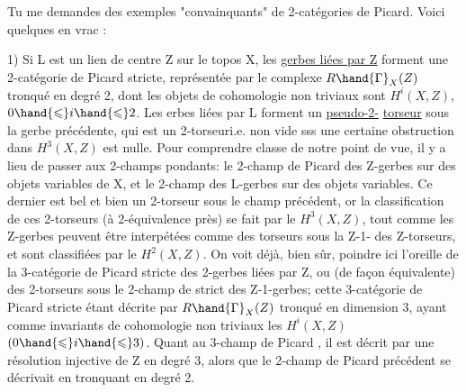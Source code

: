 
Tu me demandes des exemples "convainquants" de 2-catégories de Picard.
Voici quelques  en vrac :

 1) Si L est un lien de centre Z sur le topos X, les \uline{gerbes liées par Z}
forment une 2-catégorie de Picard stricte, représentée par le complexe
$R\hand{\Gamma}_X(Z)$ tronqué en degré 2, dont les objets de cohomologie non triviaux
sont  $H^i(X,Z)$, $0 \hand{\leqslant} i \hand{\leqslant} 2$. Les erbes liées par L forment un \uline{pseudo-2-}
\uline{torseur} sous la gerbe précédente, qui est un 2-torseur\hand{(}i.e. non vide\hand{)} sss
une certaine obstruction dans $H^3(X,Z)$ est nulle. Pour comprendre 
classe de notre point de vue, il y a lieu de passer aux 2-champs %
pondants: le 2-champ de Picard  des Z-gerbes
sur des objets variables de X, et le 2-champ des L-gerbes sur des objets
variables. Ce dernier est bel et bien un 2-torseur sous le champ précédent,
or la classification de ces  2-torseurs (à 2-équivalence près) se
fait par le $H^3(X,Z)$,  \hand{(}tout comme les Z-gerbes peuvent être
interpétées comme des torseurs sous la Z-1-  des Z-torseurs, et sont
 classifiées par le $H^2(X,Z)$\hand{)}. On voit déjà, bien sûr, poindre
ici l'oreille de la 3-catégorie de Picard stricte des 2-gerbes liées par Z,
ou (de façon équivalente) des 2-torseurs sous le 2-champ de  strict
des Z-1-gerbes; cette 3-catégorie de Picard stricte étant décrite par
$R\hand{\Gamma}_X(Z)$ tronqué en dimension 3, ayant comme invariants de cohomologie non
triviaux les $H^i(X,Z)$ $(0 \hand{\leqslant} i \hand{\leqslant} 3)$. Quant au 3-champ de Picard ,
il est décrit par une résolution injective de Z  en degré 3, alors
que le  2-champ de Picard précédent se décrivait en tronquant en degré 2.

